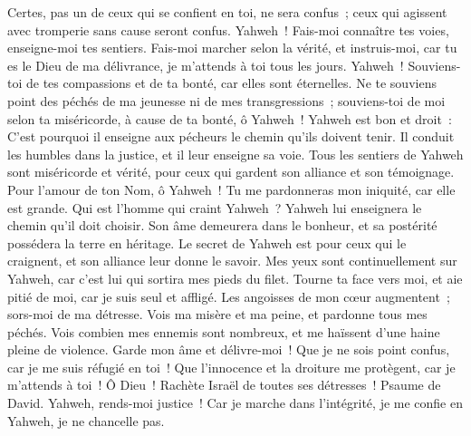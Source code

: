\begin{multicols}{2}
 Certes, pas un de ceux qui se confient en toi, ne sera confus~; ceux qui agissent avec tromperie sans cause seront confus.
 Yahweh~! Fais-moi connaître tes voies, enseigne-moi tes sentiers.
 Fais-moi marcher selon la vérité, et instruis-moi, car tu es le Dieu de ma délivrance, je m'attends à toi tous les jours.
 Yahweh~! Souviens-toi de tes compassions et de ta bonté, car elles sont éternelles.
 Ne te souviens point des péchés de ma jeunesse ni de mes transgressions~; souviens-toi de moi selon ta miséricorde, à cause de ta bonté, ô Yahweh~!
 Yahweh est bon et droit~: C'est pourquoi il enseigne aux pécheurs le chemin qu'ils doivent tenir.
 Il conduit les humbles dans la justice, et il leur enseigne sa voie.
 Tous les sentiers de Yahweh sont miséricorde et vérité, pour ceux qui gardent son alliance et son témoignage.
 Pour l'amour de ton Nom, ô Yahweh~! Tu me pardonneras mon iniquité, car elle est grande.
 Qui est l'homme qui craint Yahweh~? Yahweh lui enseignera le chemin qu'il doit choisir.
 Son âme demeurera dans le bonheur, et sa postérité possédera la terre en héritage.
 Le secret de Yahweh est pour ceux qui le craignent, et son alliance leur donne le savoir.
 Mes yeux sont continuellement sur Yahweh, car c'est lui qui sortira mes pieds du filet.
 Tourne ta face vers moi, et aie pitié de moi, car je suis seul et affligé.
 Les angoisses de mon cœur augmentent~; sors-moi de ma détresse.
 Vois ma misère et ma peine, et pardonne tous mes péchés.
 Vois combien mes ennemis sont nombreux, et me haïssent d'une haine pleine de violence.
 Garde mon âme et délivre-moi~! Que je ne sois point confus, car je me suis réfugié en toi~!
 Que l'innocence et la droiture me protègent, car je m'attends à toi~!
 Ô Dieu~! Rachète Israël de toutes ses détresses~!
\VerseOne{}Psaume de David. Yahweh, rends-moi justice~! Car je marche dans l'intégrité, je me confie en Yahweh, je ne chancelle pas.

\end{multicols}
